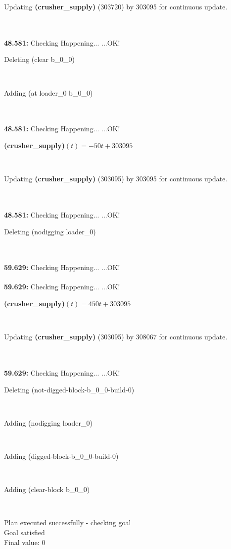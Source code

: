 \documentclass[a4paper,12pt]{article}
\newcommand{\atime}[1]{{\bf #1:}}
\newcommand{\exprn}[1]{{\sf #1}}
\newcommand{\fexprn}[1]{{\small {\bf #1}}}
\newcommand{\checkhappening}{Checking Happening... }
\newcommand{\listrow}[1]{\begin{minipage}[t]{11.5cm} #1 \end{minipage}}
\newcommand{\happeningOK}{...OK!}
\newcommand{\assignmentcts}[3]{\listrow{Updating \fexprn{#1} (#2) by #3 for continuous update.}}
\newcommand{\function}[2]{\listrow{\fexprn{#1}$(t) = #2$}}
\newcommand{\adding}[1]{\listrow{Adding \exprn{#1} }}
\newcommand{\deleting}[1]{\listrow{Deleting \exprn{#1} }}
\begin{document}
\begin{tabbing}
 \> \assignmentcts{(crusher\_supply)}{303720}{303095}\\
\\
\atime{48.581} \> \checkhappening\happeningOK\\
 \> \deleting{(clear b\_0\_0)}\\
 \> \adding{(at loader\_0 b\_0\_0)}\\
\\
\atime{48.581} \> \checkhappening\happeningOK\\
 \> \function{(crusher\_supply)}{ - 50t + 303095}\\
 \> \assignmentcts{(crusher\_supply)}{303095}{303095}\\
\\
\atime{48.581} \> \checkhappening\happeningOK\\
 \> \deleting{(nodigging loader\_0)}\\
\\
\atime{59.629} \> \checkhappening\happeningOK\\
\\
\atime{59.629} \> \checkhappening\happeningOK\\
 \> \function{(crusher\_supply)}{450t + 303095}\\
 \> \assignmentcts{(crusher\_supply)}{303095}{308067}\\
\\
\atime{59.629} \> \checkhappening\happeningOK\\
 \> \deleting{(not-digged-block-b\_0\_0-build-0)}\\
 \> \adding{(nodigging loader\_0)}\\
 \> \adding{(digged-block-b\_0\_0-build-0)}\\
 \> \adding{(clear-block b\_0\_0)}\\
\end{tabbing}
Plan executed successfully - checking goal\\
Goal satisfied\\
Final value: 0
\end{document}
